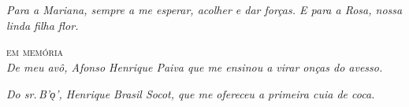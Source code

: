 



\chapter*{}
\thispagestyle{empty}

\vfill
\begin{flushright}
\small
\textit{
Para a Mariana, sempre a me esperar, 
acolher e dar forças. E para a Rosa, 
nossa linda \textit{filha flor}.}

\bigskip
\medskip

\textsc{em memória}\\
\smallskip
\textit{
De meu avô, Afonso Henrique Paiva que 
me ensinou a virar onças do avesso.}

\smallskip
\textit{
Do sr.\,B'o̖', Henrique Brasil Socot, 
que me ofereceu a primeira cuia de coca.}
\end{flushright}